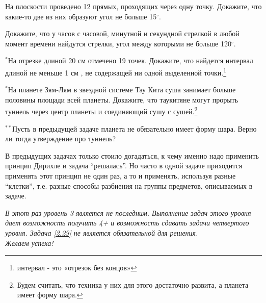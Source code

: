 \begin{thm}
	На плоскости проведено 12 прямых, проходящих через одну точку. Докажите, что какие-то две из них образуют угол не больше 15$^\circ$.
\end{thm}

\begin{thm}
	Докажите, что у часов с часовой, минутной и секундной стрелкой в любой момент времени найдутся стрелки, угол между которыми не больше 120$^\circ$.
\end{thm}

\begin{thm}
	$^\ast$На отрезке длиной 20 см отмечено 19 точек. Докажите, что найдется интервал длиной не меньше 1 см , не содержащей ни одной выделенной точки.\footnote{интервал - это «отрезок без концов»}
\end{thm}

\begin{thm}
	$^\ast$На планете Зям-Лям в звездной системе Тау Кита суша занимает больше половины площади всей планеты. Докажите, что таукитяне могут прорыть туннель через центр планеты и соединяющий сушу с сушей.\footnote{Будем считать, что техника у них для этого достаточно развита, а планета имеет форму шара.}
\end{thm}

\begin{thm}\label{2.29}
	$^{\ast\ast}$Пусть в предыдущей задаче планета не обязательно имеет форму шара. Верно ли тогда утверждение про туннель?
\end{thm}

В предыдущих задачах только стоило догадаться, к чему именно надо применить принцип Дирихле и задача “решалась”. Но часто в одной задаче приходится применять этот принцип не один раз, а то и применять, используя разные “клетки”, т.е. разные способы разбиения на группы предметов, описываемых в задаче. 

\textit{В этот раз уровень 3 является не последним. Выполнение задач этого уровня дает возможность получить 4+ и возможность сдавать задачи четвертого уровня. Задача \ref{2.29} не является обязательной для решения. \\Желаем успеха!}

